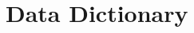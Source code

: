 \documentclass[]{article}
\begin{document}
%
%
%
% 
% 
%
%



\appendix

\section{Data Dictionary}
\label{appendix:data_dict}

\end{document}
